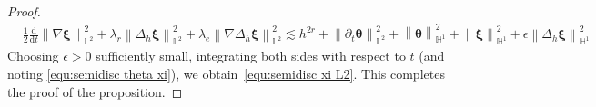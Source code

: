 \documentclass[11pt, reqno]{amsart}
\theoremstyle{definition}
\theoremstyle{remark}
\numberwithin{equation}{section}
\newcommand{\bff}{\boldsymbol}
\newcommand{\bb}{\mathbb}
\newcommand{\ddt}{\frac{\mathrm{d}}{\mathrm{d}t}}
\newcommand{\ds}{\mathrm{d}s}
\newcommand{\norm}[2]{\left\|{#1}\right\|_{#2}}
\begin{document}
\begin{proof}
\begin{align*}
	&\frac{1}{2}\ddt \norm{\nabla \bff{\xi}}{\bb{L}^2}^2
	+
	\lambda_r \norm{\Delta_h \bff{\xi}}{\bb{L}^2}^2
	+
	\lambda_e \norm{\nabla \Delta_h \bff{\xi}}{\bb{L}^2}^2
	\lesssim
	h^{2r}
	+
	\norm{\partial_t \bff{\theta}}{\bb{L}^2}^2
	+
	\norm{\bff{\theta}}{\bb{H}^1}^2
	+
	\norm{\bff{\xi}}{\bb{H}^1}^2
	+
	\epsilon \norm{\Delta_h \bff{\xi}}{\bb{H}^1}^2
\end{align*}
Choosing $\epsilon>0$ sufficiently small, integrating both sides with respect to $t$ (and noting \eqref{equ:semidisc theta xi}), we obtain~\eqref{equ:semidisc xi L2}. This completes the proof of the proposition.
\end{proof}


%
\end{document}
